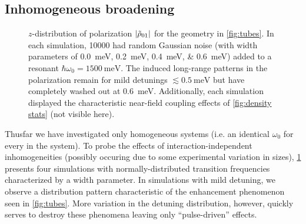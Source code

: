 \subsection{Inhomogeneous broadening}

\begin{figure}
  \centering
  
  \caption{\label{fig:broadened} 
    $z$-distribution of polarization $\abs{\tilde{\rho}_{01}}$ for the geometry in \cref{fig:tubes}.
    In each simulation, \num{10000} \qds{} had random Gaussian noise (with width parameters of \SIlist{0.0;0.2;0.4;0.6}{\milli\eV}) added to a resonant $\hbar \omega_0 = \SI{1500}{\milli\eV}$.
    The induced long-range patterns in the polarization remain for mild detunings $\lesssim \SI{0.5}{\milli\eV}$ but have completely washed out at \SI{0.6}{\milli\eV}.
    Additionally, each simulation displayed the characteristic near-field coupling effects of \cref{fig:density stats} (not visible here).
  }
\end{figure}

Thusfar we have investigated only homogeneous systems (i.e. an identical $\omega_0$ for every \qd{} in the system).
To probe the effects of interaction-independent inhomogeneities (possibly occuring due to some experimental variation in \qd{} sizes), \cref{fig:broadened} presents four simulations with normally-distributed transition frequencies characterized by a width parameter.
In simulations with mild detuning, we observe a distribution pattern characteristic of the enhancement phenomenon seen in \cref{fig:tubes}.
More variation in the detuning distribution, however, quickly serves to destroy these phenomena leaving only ``pulse-driven'' effects.
